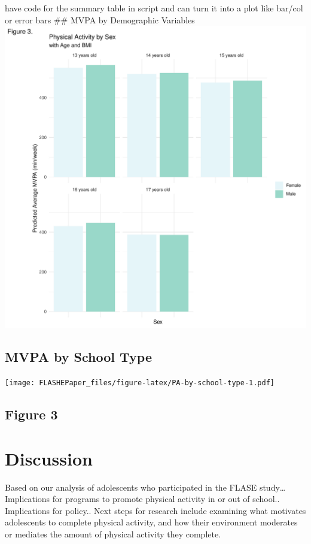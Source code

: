 \documentclass[
]{article}
\begin{document}
have code for the summary table in script and can turn it into a plot
like bar/col or error bars \#\# MVPA by Demographic Variables
\includegraphics{FLASHEPaper_files/figure-latex/PA-BMI-race-ethnicity-1.pdf}

\hypertarget{mvpa-by-school-type}{%
\subsection{MVPA by School Type}\label{mvpa-by-school-type}}

\texttt{[image: FLASHEPaper\_files/figure-latex/PA-by-school-type-1.pdf]}

\hypertarget{figure-3}{%
\subsection{Figure 3}\label{figure-3}}

\hypertarget{discussion}{%
\section{Discussion}\label{discussion}}

Based on our analysis of adolescents who participated in the FLASE
study\ldots{} Implications for programs to promote physical activity in
or out of school.. Implications for policy.. Next steps for research
include examining what motivates adolescents to complete physical
activity, and how their environment moderates or mediates the amount of
physical activity they complete.
\end{document}

